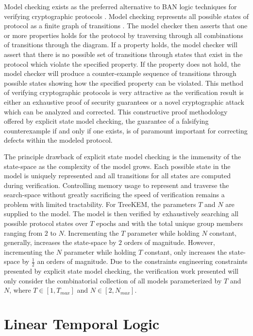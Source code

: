 Model checking exists as the preferred alternative to BAN logic techniques for verifying cryptographic protocols \autocite{kacprzak2006comparing} \autocite{lomuscio2007verification} \autocite{van2004symbolic}.
Model checking represents all possible states of protocol as a finite graph of transitions \autocite{clarke1981design}.
The model checker then asserts that one or more properties holds for the protocol by traversing through all combinations of transitions through the diagram.
If a property holds, the model checker will assert that there is no possible set of transitions through states that exist in the protocol which violate the specified property.
If the property does not hold, the model checker will produce a counter-example sequence of transitions through possible states showing how the specified property can be violated.
This method of verifying cryptographic protocols is very attractive as the verification result is either an exhaustive proof of security guarantees or a novel cryptographic attack which can be analyzed and corrected.
This constructive proof methodology offered by explicit state model checking, the guarantee of a falsifying counterexample if and only if one exists, is of paramount important for correcting defects within the modeled protocol.

The principle drawback of explicit state model checking is the immensity of the state-space as the complexity of the model grows.
Each possible state in the model is uniquely represented and all transitions for all states are computed during verification.
Controlling memory usage to represent and traverse the search-space without greatly sacrificing the speed of verification remains a problem with limited tractability.
For TreeKEM, the parameters \(T\) and \(N\) are supplied to the model.
The model is then verified by exhaustively searching all possible protocol states over \(T\) epochs and with the total unique group members ranging from \(2\) to \(N\).
Incrementing the \(T\) parameter while holding \(N\) constant, generally, increases the state-space by \(2\) orders of magnitude.
However, incrementing the \(N\) parameter while holding \(T\) constant, only increases the state-space by \(\frac{1}{2}\) an orders of magnitude.
Due to the constraints engineering constraints presented by explicit state model checking, the verification work presented will only consider the combinatorial collection of all models parameterized by \(T\) and \(N\), where \(T \in [1, T_{max}]\) and \(N \in [2, N_{max}]\).


\hypertarget{linear-temporal-logic}{%
\section{Linear Temporal Logic}\label{linear-temporal-logic}}

